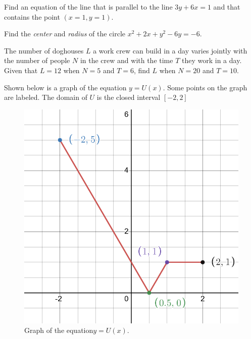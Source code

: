 \documentclass[12pt,fleqn]{exam}
\begin{document}
\begin{questions}
\begin{parts}
\end{parts}

\newpage


\question [5] Find an equation of the line that is parallel to the
line $3 y + 6 x = 1$ and that contains the point $(x=1,y=1)$.
\begin{solution}[1.5in] 
\end{solution}

\question [5] Find the \emph{center} and \emph{radius} of the circle
\(
   x^2 + 2 x + y^2 - 6 y = -6.
\)

\begin{solution}[2.4in]
\end{solution}

\question [5] The number of doghouses $L$ a work crew can build
 in a day varies jointly with the number of people $N$ in the crew and with
the time $T$  they work in a day. Given that $L = 12$ when $N = 5$ and $T = 6$, find $L$ when
$N = 20$ and $T = 10$.
\begin{solution}%


\end{solution}
\newpage

\question Shown below is a graph of the equation $y = U(x)$. 
Some points on the graph are labeled. The domain of $U$ is
the closed interval $[-2,2]$

\begin{figure}[h]
    \begin{center}
    \includegraphics[scale=0.2]{desmos-graph(14).png}
\end{center}
\caption{Graph of the equation$y = U(x)$.}
\end{figure}


\end{questions}
\end{document}
